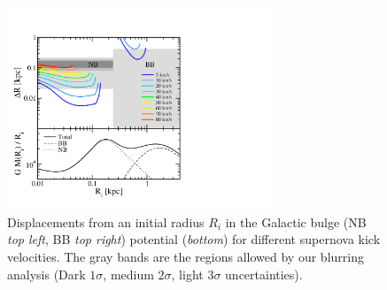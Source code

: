 \documentclass[doublespace,nopageskip]{VTthesis}
\begin{document}
\begin{figure}[htb]
	\centering
	\includegraphics[width=0.7\textwidth,trim=0.20in 0.55in 3.7in 1.2in,clip=true]{Figures/511keV/Fig_bulgeblur_total_2.pdf}%
	\caption{Displacements from an initial radius $R_i$ in the Galactic bulge (NB \textit{top left}, BB \textit{top right}) potential (\textit{bottom}) for different supernova kick velocities. The gray bands are the regions allowed by our blurring analysis (Dark $1\sigma$, medium $2\sigma$, light $3\sigma$ uncertainties).}%
	\label{fig:kicks}%
\end{figure}
\end{document}
